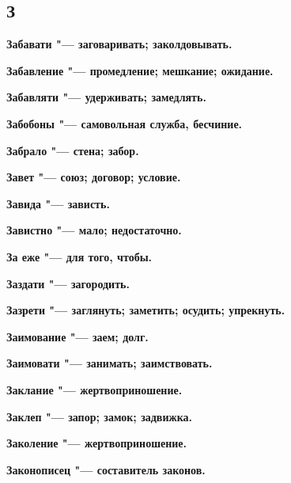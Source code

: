 \begin{mymulticols}{2}
\section{З} 





\bfseries Забавати\normalfont{} "--- заговаривать; заколдовывать. 




\bfseries Забавление\normalfont{} "--- промедление; мешкание; ожидание. 




\bfseries Забавляти\normalfont{} "--- удерживать; замедлять. 




\bfseries Забобоны\normalfont{} "--- самовольная служба, бесчиние. 




\bfseries Забрало\normalfont{} "--- стена; забор. 




\bfseries Завет\normalfont{} "--- союз; договор; условие. 




\bfseries Завида\normalfont{} "--- зависть. 




\bfseries Завистно\normalfont{} "--- мало; недостаточно. 




\bfseries За еже\normalfont{} "--- для того, чтобы. 




\bfseries Заздати\normalfont{} "--- загородить. 




\bfseries Зазрети\normalfont{} "--- заглянуть; заметить; осудить; упрекнуть. 




\bfseries Заимование\normalfont{} "--- заем; долг. 




\bfseries Заимовати\normalfont{} "--- занимать; заимствовать. 




\bfseries Заклание\normalfont{} "--- жертвоприношение. 




\bfseries Заклеп\normalfont{} "--- запор; замок; задвижка. 




\bfseries Заколение\normalfont{} "--- жертвоприношение. 




\bfseries Законописец\normalfont{} "--- составитель законов. 





\end{mymulticols}

